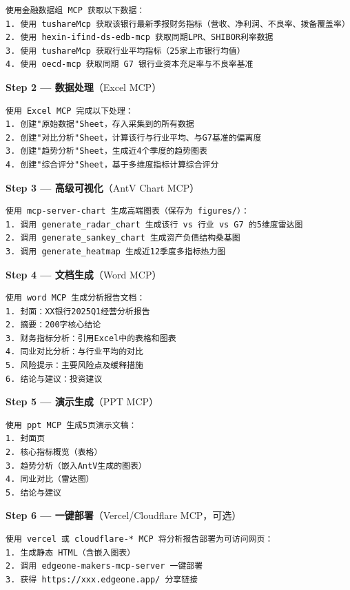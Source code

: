 \begin{lstlisting}
使用金融数据组 MCP 获取以下数据：
1. 使用 tushareMcp 获取该银行最新季报财务指标（营收、净利润、不良率、拨备覆盖率）
2. 使用 hexin-ifind-ds-edb-mcp 获取同期LPR、SHIBOR利率数据
3. 使用 tushareMcp 获取行业平均指标（25家上市银行均值）
4. 使用 oecd-mcp 获取同期 G7 银行业资本充足率与不良率基准
\end{lstlisting}

\textbf{Step 2 — 数据处理}（Excel MCP）

\begin{lstlisting}
使用 Excel MCP 完成以下处理：
1. 创建"原始数据"Sheet，存入采集到的所有数据
2. 创建"对比分析"Sheet，计算该行与行业平均、与G7基准的偏离度
3. 创建"趋势分析"Sheet，生成近4个季度的趋势图表
4. 创建"综合评分"Sheet，基于多维度指标计算综合评分
\end{lstlisting}

\textbf{Step 3 — 高级可视化}（AntV Chart MCP）

\begin{lstlisting}
使用 mcp-server-chart 生成高端图表（保存为 figures/）：
1. 调用 generate_radar_chart 生成该行 vs 行业 vs G7 的5维度雷达图
2. 调用 generate_sankey_chart 生成资产负债结构桑基图
3. 调用 generate_heatmap 生成近12季度多指标热力图
\end{lstlisting}

\textbf{Step 4 — 文档生成}（Word MCP）

\begin{lstlisting}
使用 word MCP 生成分析报告文档：
1. 封面：XX银行2025Q1经营分析报告
2. 摘要：200字核心结论
3. 财务指标分析：引用Excel中的表格和图表
4. 同业对比分析：与行业平均的对比
5. 风险提示：主要风险点及缓释措施
6. 结论与建议：投资建议
\end{lstlisting}

\textbf{Step 5 — 演示生成}（PPT MCP）

\begin{lstlisting}
使用 ppt MCP 生成5页演示文稿：
1. 封面页
2. 核心指标概览（表格）
3. 趋势分析（嵌入AntV生成的图表）
4. 同业对比（雷达图）
5. 结论与建议
\end{lstlisting}

\textbf{Step 6 — 一键部署}（Vercel/Cloudflare MCP，可选）

\begin{lstlisting}
使用 vercel 或 cloudflare-* MCP 将分析报告部署为可访问网页：
1. 生成静态 HTML（含嵌入图表）
2. 调用 edgeone-makers-mcp-server 一键部署
3. 获得 https://xxx.edgeone.app/ 分享链接
\end{lstlisting}

